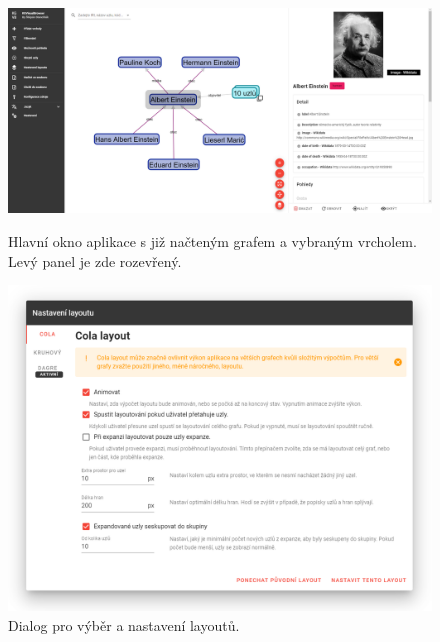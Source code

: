 \begin{figure}
    \centering
    \includegraphics[width=\textwidth]{media/einstein.png}
    \caption{Hlavní okno aplikace s již načteným grafem a vybraným vrcholem. Levý panel je zde rozevřený.}
    \includegraphics[width=\textwidth]{media/layout.png}
    \caption{Dialog pro výběr a nastavení layoutů.}
\end{figure}